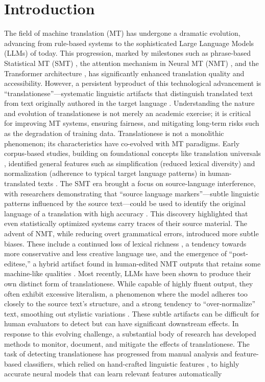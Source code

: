 \section{Introduction} The field of machine translation (MT) has undergone a dramatic evolution, advancing from rule-based systems to the sophisticated Large Language Models (LLMs) of today. This progression, marked by milestones such as phrase-based Statistical MT (SMT) \cite{koehn2003statistical}, the attention mechanism in Neural MT (NMT) \cite{bahdanau2015neural}, and the Transformer architecture \cite{vaswani2017attention}, has significantly enhanced translation quality and accessibility. However, a persistent byproduct of this technological advancement is ``translationese''---systematic linguistic artifacts that distinguish translated text from text originally authored in the target language \cite{gellerstam1986translationese}. Understanding the nature and evolution of translationese is not merely an academic exercise; it is critical for improving MT systems, ensuring fairness, and mitigating long-term risks such as the degradation of training data. Translationese is not a monolithic phenomenon; its characteristics have co-evolved with MT paradigms. Early corpus-based studies, building on foundational concepts like translation universals \cite{baker1993corpus}, identified general features such as simplification (reduced lexical diversity) and normalization (adherence to typical target language patterns) in human-translated texts \cite{laviosa1998corpus}. The SMT era brought a focus on source-language interference, with researchers demonstrating that ``source language markers''---subtle linguistic patterns influenced by the source text---could be used to identify the original language of a translation with high accuracy \cite{van2008source,koppel2011translationese}. This discovery highlighted that even statistically optimized systems carry traces of their source material. The advent of NMT, while reducing overt grammatical errors, introduced more subtle biases. These include a continued loss of lexical richness \cite{vanmassenhove2019getting}, a tendency towards more conservative and less creative language use, and the emergence of ``post-editese,'' a hybrid artifact found in human-edited NMT outputs that retains some machine-like qualities \cite{toral2019post}. Most recently, LLMs have been shown to produce their own distinct form of translationese. While capable of highly fluent output, they often exhibit excessive literalism, a phenomenon where the model adheres too closely to the source text's structure, and a strong tendency to ``over-normalize'' text, smoothing out stylistic variations \cite{li2025how}. These subtle artifacts can be difficult for human evaluators to detect but can have significant downstream effects. In response to this evolving challenge, a substantial body of research has developed methods to monitor, document, and mitigate the effects of translationese. The task of detecting translationese has progressed from manual analysis and feature-based classifiers, which relied on hand-crafted linguistic features \cite{baroni2006new,volansky2015features}, to highly accurate neural models that can learn relevant features automatically 